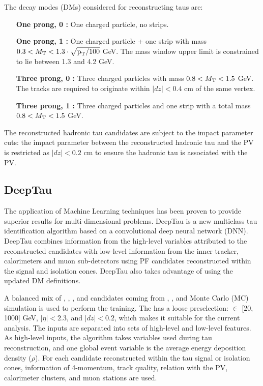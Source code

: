 The decay modes (DMs) considered for reconstructing taus are:
\begin{itemize}
\item[{\bf One prong, 0 \Pgpz:}] One charged particle, no strips.
\item[{\bf One prong, 1 \Pgpz:}] One charged particle + one strip with mass $0.3 < M_\mathrm{T} < 1.3 \cdot \sqrt{\text{p}_\text{T}/100}$ GeV. The mass window upper limit is constrained to lie between 1.3 and 4.2 GeV.
\item[{\bf Three prong, 0 \Pgpz:}] Three charged particles with mass $0.8 < M_\mathrm{T} < 1.5$ GeV. The tracks are required to originate within $|dz| < 0.4$ cm of the same vertex.
\item[{\bf Three prong, 1 \Pgpz:}] Three charged particles and one strip with a total mass $0.8 < M_\mathrm{T} < 1.5$ GeV.
\end{itemize}

The reconstructed hadronic tau candidates are subject to the impact parameter cuts: the impact parameter between the reconstructed hadronic tau and the PV is restricted as $|dz| < 0.2$ cm to ensure the hadronic tau is associated with the PV.

\subsection{DeepTau}
\label{sec:tauid_dt}
The application of Machine Learning techniques has been proven to provide superior results for multi-dimensional problems. DeepTau is a new multiclass tau identification algorithm based on a convolutional deep neural network (DNN). DeepTau combines information from the high-level variables attributed to the reconstructed \tauh candidates with low-level information from the inner tracker, calorimeters and muon sub-detectors using PF candidates reconstructed within the \tauh signal and isolation cones. DeepTau also takes advantage of using the updated DM definitions.

A balanced mix of \taue, \taum, \tauh, and \tauj candidates coming from \ttbar, \wjets, and \zjets Monte Carlo (MC) simulation is used to perform the training. The \tauh has a loose preselection: \pt $\in$ [20, 1000] GeV, $|\eta| < 2.3$, and $|dz| < 0.2$, which makes it suitable for the current analysis. The inputs are separated into sets of high-level and low-level features. As high-level inputs, the algorithm takes variables used during tau reconstruction, and one global event variable is the average energy deposition density ($\rho$). For each candidate reconstructed within the tau signal or isolation cones, information of 4-momentum, track quality, relation with the PV, calorimeter clusters, and muon stations are used.

